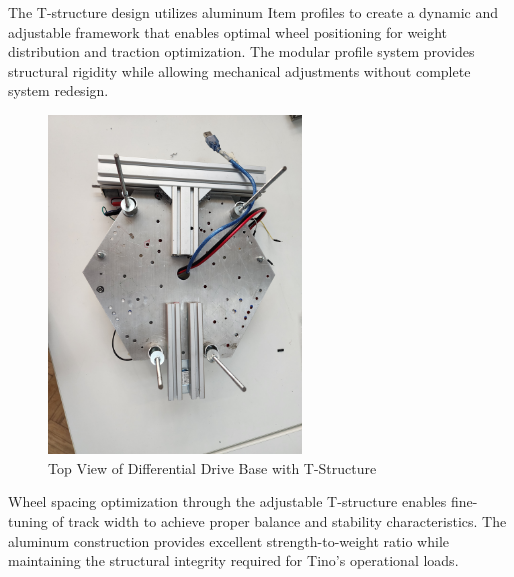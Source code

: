 The T-structure design utilizes aluminum Item profiles to create a dynamic and adjustable framework that enables optimal wheel positioning for weight distribution and traction optimization. The modular profile system provides structural rigidity while allowing mechanical adjustments without complete system redesign.
\begin{figure}[H]
    \centering
    \includegraphics[width=0.6\textwidth]{Images/NewBaseDifferentialDrive (5).jpg}
    \caption{Top View of Differential Drive Base with T-Structure}
    \label{fig:differential_base_top}
\end{figure}
Wheel spacing optimization through the adjustable T-structure enables fine-tuning of track width to achieve proper balance and stability characteristics. The aluminum construction provides excellent strength-to-weight ratio while maintaining the structural integrity required for Tino's operational loads.


